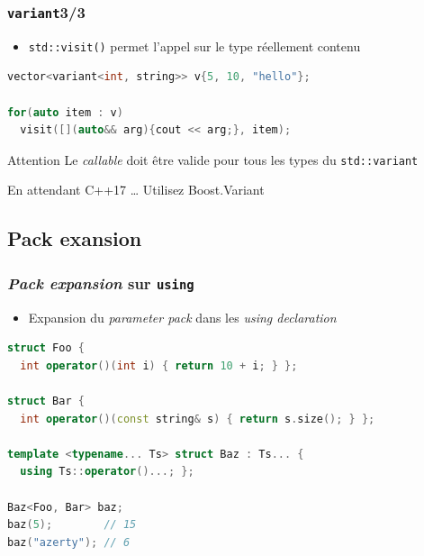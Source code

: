 \documentclass[C++.tex]{subfiles}
\begin{document}
\begin{frame}[fragile]
	\frametitle{\lstinline|variant|\titlehfill{}3/3}
	\begin{itemize}
		\item \lstinline|std::visit()| permet l'appel sur le type réellement contenu
	\end{itemize}

	\begin{lstlisting}[language=C++]
vector<variant<int, string>> v{5, 10, "hello"};

for(auto item : v)
  visit([](auto&& arg){cout << arg;}, item);\end{lstlisting}

	\begin{alertblock}{Attention}
		Le \textit{callable} doit être valide pour tous les types du \lstinline|std::variant| 

	\end{alertblock}

	\begin{block}{En attendant C++17 \ldots}
		Utilisez Boost.Variant
	\end{block}
\end{frame}

\subsection*{Pack exansion}
\begin{frame}[fragile]
	\frametitle{\textit{Pack expansion} sur \lstinline|using|}
	\begin{itemize}
		\item Expansion du \textit{parameter pack} dans les \textit{using declaration}
	\end{itemize}

	\begin{lstlisting}[language=C++]
struct Foo {
  int operator()(int i) { return 10 + i; } };

struct Bar {
  int operator()(const string& s) { return s.size(); } };

template <typename... Ts> struct Baz : Ts... {
  using Ts::operator()...; };

Baz<Foo, Bar> baz;
baz(5);        // 15
baz("azerty"); // 6
\end{lstlisting}
\end{frame}
\end{document}
